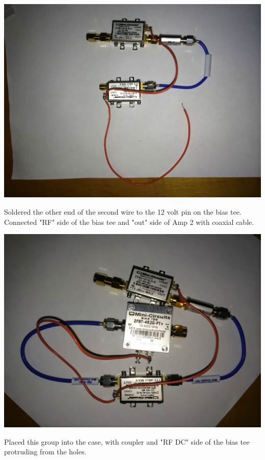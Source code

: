 \documentclass[11pt]{article} %
\begin{document}
\begin{center}
\includegraphics[scale=0.13]{lna/04.jpeg}
\end{center}

Soldered the other end of the second wire to the 12 volt pin on the bias tee.
Connected "RF" side of the bias tee and "out" side of Amp 2 with coaxial cable. 

\begin{center}
\includegraphics[scale=0.15]{lna/05.jpeg}
\end{center}

Placed this group into the case, with coupler and "RF DC" side of the bias tee protruding from the holes. 
\end{document}
